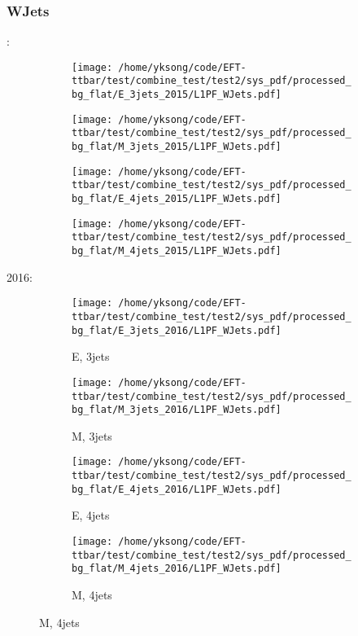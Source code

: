 \documentclass{beamer}
\begin{document}
\begin{frame}
\frametitle{WJets}
\fontsize{5}{1}:
\begin{figure}
\centering
\begin{subfigure}[b]{0.24\textwidth}
\texttt{[image: /home/yksong/code/EFT-ttbar/test/combine\_test/test2/sys\_pdf/processed\_bg\_flat/E\_3jets\_2015/L1PF\_WJets.pdf]}
\end{subfigure}
\begin{subfigure}[b]{0.24\textwidth}
\texttt{[image: /home/yksong/code/EFT-ttbar/test/combine\_test/test2/sys\_pdf/processed\_bg\_flat/M\_3jets\_2015/L1PF\_WJets.pdf]}
\end{subfigure}
\begin{subfigure}[b]{0.24\textwidth}
\texttt{[image: /home/yksong/code/EFT-ttbar/test/combine\_test/test2/sys\_pdf/processed\_bg\_flat/E\_4jets\_2015/L1PF\_WJets.pdf]}
\end{subfigure}
\begin{subfigure}[b]{0.24\textwidth}
\texttt{[image: /home/yksong/code/EFT-ttbar/test/combine\_test/test2/sys\_pdf/processed\_bg\_flat/M\_4jets\_2015/L1PF\_WJets.pdf]}
\end{subfigure}
\end{figure}
2016:
\begin{figure}
\centering
\begin{subfigure}[b]{0.24\textwidth}
\texttt{[image: /home/yksong/code/EFT-ttbar/test/combine\_test/test2/sys\_pdf/processed\_bg\_flat/E\_3jets\_2016/L1PF\_WJets.pdf]}
\captionsetup{font=tiny}
\caption{E, 3jets}
\end{subfigure}
\begin{subfigure}[b]{0.24\textwidth}
\texttt{[image: /home/yksong/code/EFT-ttbar/test/combine\_test/test2/sys\_pdf/processed\_bg\_flat/M\_3jets\_2016/L1PF\_WJets.pdf]}
\captionsetup{font=tiny}
\caption{M, 3jets}
\end{subfigure}
\begin{subfigure}[b]{0.24\textwidth}
\texttt{[image: /home/yksong/code/EFT-ttbar/test/combine\_test/test2/sys\_pdf/processed\_bg\_flat/E\_4jets\_2016/L1PF\_WJets.pdf]}
\captionsetup{font=tiny}
\caption{E, 4jets}
\end{subfigure}
\begin{subfigure}[b]{0.24\textwidth}
\texttt{[image: /home/yksong/code/EFT-ttbar/test/combine\_test/test2/sys\_pdf/processed\_bg\_flat/M\_4jets\_2016/L1PF\_WJets.pdf]}
\captionsetup{font=tiny}
\caption{M, 4jets}
\end{subfigure}
\end{figure}
\end{frame}
\end{document}
